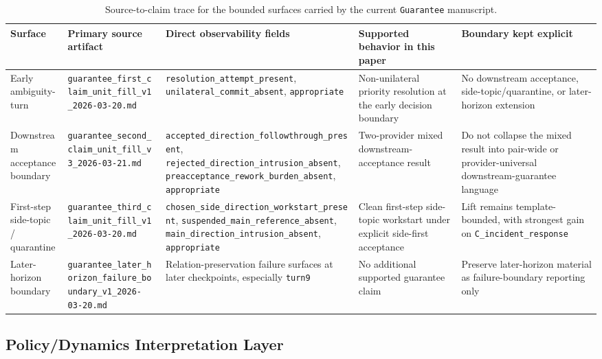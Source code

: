 \documentclass[11pt]{article}
\begin{document}
\begin{table}[ht]
\centering
\begin{tabular}{|p{}|p{}|p{}|p{}|p{}|}
\hline
\textbf{Surface} & \textbf{Primary source artifact} & \textbf{Direct observability fields} & \textbf{Supported behavior in this paper} & \textbf{Boundary kept explicit} \\
\hline
Early ambiguity-turn & \texttt{guarantee\_first\_claim\_unit\_fill\_v1\_2026-03-20.md} & \texttt{resolution\_attempt\_present}, \texttt{unilateral\_commit\_absent}, \texttt{appropriate} & Non-unilateral priority resolution at the early decision boundary & No downstream acceptance, side-topic/quarantine, or later-horizon extension \\
\hline
Downstream acceptance boundary & \texttt{guarantee\_second\_claim\_unit\_fill\_v3\_2026-03-21.md} & \texttt{accepted\_direction\_followthrough\_present}, \texttt{rejected\_direction\_intrusion\_absent}, \texttt{preacceptance\_rework\_burden\_absent}, \texttt{appropriate} & Two-provider mixed downstream-acceptance result & Do not collapse the mixed result into pair-wide or provider-universal downstream-guarantee language \\
\hline
First-step side-topic / quarantine & \texttt{guarantee\_third\_claim\_unit\_fill\_v1\_2026-03-20.md} & \texttt{chosen\_side\_direction\_workstart\_present}, \texttt{suspended\_main\_reference\_absent}, \texttt{main\_direction\_intrusion\_absent}, \texttt{appropriate} & Clean first-step side-topic workstart under explicit side-first acceptance & Lift remains template-bounded, with strongest gain on \texttt{C\_incident\_response} \\
\hline
Later-horizon boundary & \texttt{guarantee\_later\_horizon\_failure\_boundary\_v1\_2026-03-20.md} & Relation-preservation failure surfaces at later checkpoints, especially \texttt{turn9} & No additional supported guarantee claim & Preserve later-horizon material as failure-boundary reporting only \\
\hline
\end{tabular}
\caption{Source-to-claim trace for the bounded surfaces carried by the current
\texttt{Guarantee} manuscript.}
\end{table}

\subsection{Policy/Dynamics Interpretation Layer}
\end{document}
